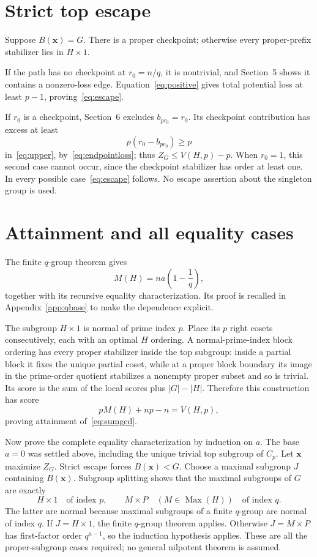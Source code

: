 \documentclass[11pt,letterpaper]{article}
\theoremstyle{definition}
\newcommand{\Max}{\operatorname{Max}}
\begin{document}
\section{Strict top escape}
Suppose $B(\mathbf{x})=G$. There is a proper checkpoint; otherwise every proper-prefix stabilizer lies in $H\times1$.

If the path has no checkpoint at $r_0=n/q$, it is nontrivial, and Section~5 shows it contains a nonzero-loss edge. Equation~\eqref{eq:positive} gives total potential loss at least $p-1$, proving~\eqref{eq:escape}.

If $r_0$ is a checkpoint, Section~6 excludes $b_{pr_0}=r_0$. Its checkpoint contribution has excess at least
\[
p(r_0-b_{pr_0})\ge p
\]
in~\eqref{eq:upper}, by~\eqref{eq:endpointloss}; thus $Z_G\le V(H,p)-p$. When $r_0=1$, this second case cannot occur, since the checkpoint stabilizer has order at least one. In every possible case~\eqref{eq:escape} follows. No escape assertion about the singleton group is used.

\section{Attainment and all equality cases}
The finite $q$-group theorem gives
\begin{equation}
M(H)=na\left(1-\frac1q\right),\label{eq:qbase}
\end{equation}
together with its recursive equality characterization. Its proof is recalled in Appendix~\ref{app:qbase} to make the dependence explicit.

The subgroup $H\times1$ is normal of prime index $p$. Place its $p$ right cosets consecutively, each with an optimal $H$ ordering. A normal-prime-index block ordering has every proper stabilizer inside the top subgroup: inside a partial block it fixes the unique partial coset, while at a proper block boundary its image in the prime-order quotient stabilizes a nonempty proper subset and so is trivial. Its score is the sum of the local scores plus $|G|-|H|$. Therefore this construction has score
\[
pM(H)+np-n=V(H,p),
\]
proving attainment of~\eqref{eq:sumgcd}.

Now prove the complete equality characterization by induction on $a$. The base $a=0$ was settled above, including the unique trivial top subgroup of $C_p$. Let $\mathbf{x}$ maximize $Z_G$. Strict escape forces $B(\mathbf{x})<G$. Choose a maximal subgroup $J$ containing $B(\mathbf{x})$. Subgroup splitting shows that the maximal subgroups of $G$ are exactly
\[
H\times1\quad\text{of index }p,\qquad
M\times P\quad(M\in\Max(H))\quad\text{of index }q.
\]
The latter are normal because maximal subgroups of a finite $q$-group are normal of index $q$. If $J=H\times1$, the finite $q$-group theorem applies. Otherwise $J=M\times P$ has first-factor order $q^{a-1}$, so the induction hypothesis applies. These are all the proper-subgroup cases required; no general nilpotent theorem is assumed.
\end{document}
